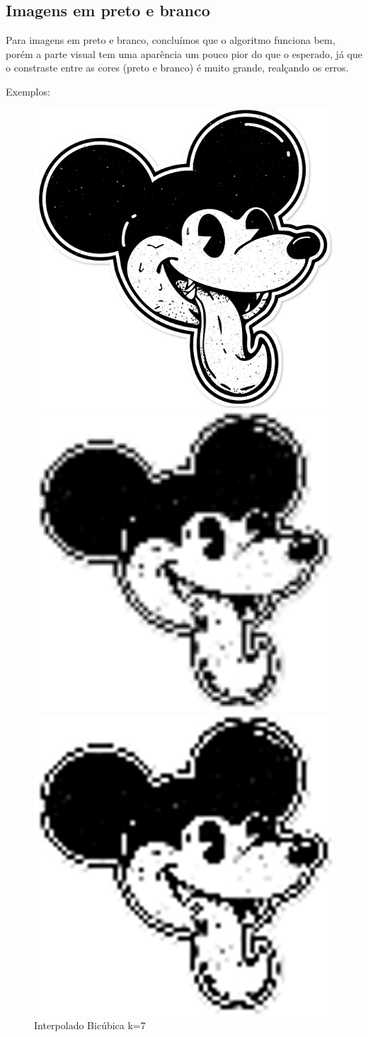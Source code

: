 \documentclass[12pt]{article}
\begin{document}
\subsection{Imagens em preto e branco}
Para imagens em preto e branco, concluímos  que o algoritmo funciona bem, porém a parte visual tem uma aparência um pouco pior do que o esperado, já que o constraste entre as cores (preto e branco) é muito grande, realçando os erros.

Exemplos:
\begin{figure}[H]
  \centering
  \begin{minipage}{.5\textwidth}
    \centering
    \includegraphics[width=.4\linewidth]{imagens/img_mickey/mickey.png}
    \caption{Original}
  \end{minipage}
  \begin{minipage}{.5\linewidth}
  \end{minipage}
  \begin{minipage}{.5\textwidth}
    \centering
    \includegraphics[width=.4\linewidth]{imagens/img_mickey/mickey_1_7_1.png}
    \caption{Interpolado Bilinear k=7}
  \end{minipage}%
  \begin{minipage}{.5\textwidth}
    \centering
    \includegraphics[width=.4\linewidth]{imagens/img_mickey/mickey_2_7_1.png}
    \caption{Interpolado Bicúbica k=7}
  \end{minipage}
\end{figure}
\end{document}
